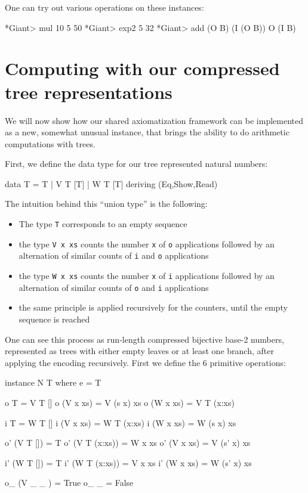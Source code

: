 \documentclass{TOOLS/llncs}
\begin{document}
One can try out various operations on these instances:
\begin{codex}
*Giant> mul 10 5
50
*Giant> exp2 5
32
*Giant> add (O B) (I (O B))
O (I B)
\end{codex}

\section{Computing with our compressed tree representations} \label{T}

We will now show how our shared axiomatization framework can be
implemented as a new, somewhat unusual instance, that brings
the ability to do arithmetic computations
with trees.

First, we define the data type for our tree represented natural numbers:
\begin{code}
data T = T | V T [T] | W T [T] deriving (Eq,Show,Read)
\end{code}
The intuition behind this ``union type'' is the following:
\begin{itemize}
\item The type {\tt T} corresponds to an empty sequence 
\item the type {\tt V x xs} counts the number {\tt x} of {\tt o} applications followed by an alternation
of similar counts of {\tt i} and {\tt o} applications

\item the type {\tt W x xs} counts the number {\tt x} of {\tt i} applications followed by an alternation
of similar counts of {\tt o} and {\tt i} applications

\item the same principle is applied recursively for the counters, until the empty sequence is reached
\end{itemize}
One can see this process as run-length compressed bijective base-2 numbers, represented as trees
with either empty leaves or at least one branch, after applying the encoding recursively.
First we define the 6 primitive operations:
\begin{code}
instance N T where
  e = T
  
  o T = V T []
  o (V x xs) = V (s x) xs
  o (W x xs) = V T (x:xs)

  i T = W T []
  i (V x xs) = W T (x:xs)
  i (W x xs) = W (s x) xs
  
  o' (V T []) = T
  o' (V T (x:xs)) = W x xs
  o' (V x xs) = V (s' x) xs

  i' (W T []) = T
  i' (W T (x:xs)) = V x xs
  i' (W x xs) = W (s' x) xs
  
  o_ (V _ _ ) = True
  o_ _ = False
\end{code}
\end{document}

